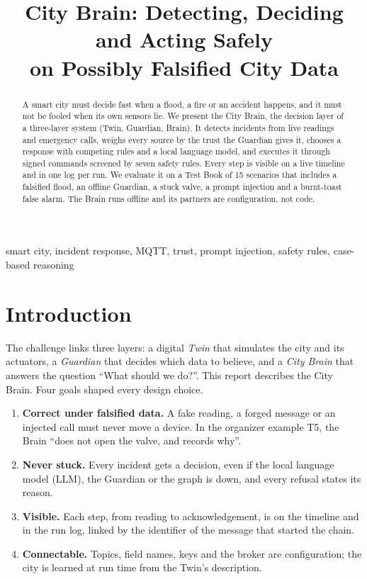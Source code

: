 \documentclass[conference]{IEEEtran}
\begin{document}
\title{City Brain: Detecting, Deciding and Acting Safely\\on Possibly Falsified City Data}


\maketitle

\begin{abstract}
A smart city must decide fast when a flood, a fire or an accident happens, and it must not
be fooled when its own sensors lie. We present the City Brain, the decision layer of a
three-layer system (Twin, Guardian, Brain). It detects incidents from live readings and
emergency calls, weighs every source by the trust the Guardian gives it, chooses a response
with competing rules and a local language model, and executes it through signed commands
screened by seven safety rules. Every step is visible on a live timeline and in one log per
run. We evaluate it on a Test Book of 15 scenarios that includes a falsified flood, an offline
Guardian, a stuck valve, a prompt injection and a burnt-toast false alarm. The Brain runs
offline and its partners are configuration, not code.
\end{abstract}

\begin{IEEEkeywords}
smart city, incident response, MQTT, trust, prompt injection, safety rules, case-based reasoning
\end{IEEEkeywords}





\section{Introduction}
The challenge links three layers: a digital \emph{Twin} that simulates the city and its actuators,
a \emph{Guardian} that decides which data to believe, and a \emph{City Brain} that answers the
question ``What should we do?''. This report describes the City Brain. Four goals shaped every design choice.

\begin{enumerate}
\item \textbf{Correct under falsified data.} A fake reading, a forged message or an injected call must
never move a device. In the organizer example T5, the Brain ``does not open the valve, and records why''.
\item \textbf{Never stuck.} Every incident gets a decision, even if the local language model (LLM),
the Guardian or the graph is down, and every refusal states its reason.
\item \textbf{Visible.} Each step, from reading to acknowledgement, is on the timeline and in the run log,
linked by the identifier of the message that started the chain.
\item \textbf{Connectable.} Topics, field names, keys and the broker are configuration; the city is
learned at run time from the Twin's description.
\end{enumerate}
\end{document}

